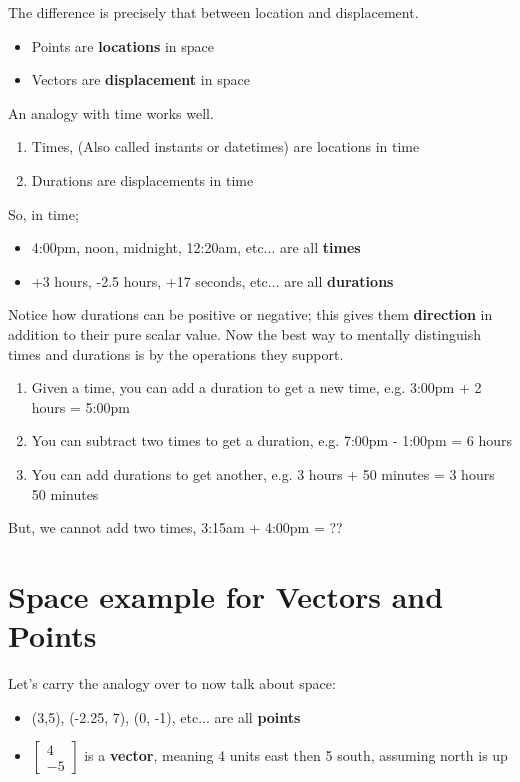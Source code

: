 \documentclass{article}
\begin{document}
The difference is precisely that between location and displacement.

\begin{itemize}
    \item Points are \textbf{locations} in space
    \item Vectors are \textbf{displacement} in space
\end{itemize}

An analogy with time works well.

\begin{enumerate}
    \item Times, (Also called instants or datetimes) are locations in time
    \item Durations are displacements in time
\end{enumerate}

So, in time;


\begin{itemize}
    \item 4:00pm, noon, midnight, 12:20am, etc... are all \textbf{times}
    \item +3 hours, -2.5 hours, +17 seconds, etc... are all \textbf{durations}
\end{itemize}

Notice how durations can be positive or negative; this gives them \textbf{direction} in addition to their pure scalar value. Now the best way to mentally distinguish times and durations is by the operations they support.

\begin{enumerate}
    \item Given a time, you can add a duration to get a new time, e.g. 3:00pm + 2 hours = 5:00pm
    \item You can subtract two times to get a duration, e.g. 7:00pm - 1:00pm = 6 hours
    \item You can add durations to get another, e.g. 3 hours + 50 minutes = 3 hours 50 minutes
\end{enumerate}

But, we cannot add two times, 3:15am + 4:00pm = ??

\section{Space example for Vectors and Points}

Let's carry the analogy over to now talk about space:

\begin{itemize}
    \item (3,5), (-2.25, 7), (0, -1), etc... are all \textbf{points}
    \item $\begin{bmatrix} 4 \\ -5 \end{bmatrix}$ is a \textbf{vector}, meaning 4 units east then 5 south, assuming north is up
\end{itemize}
\end{document}
